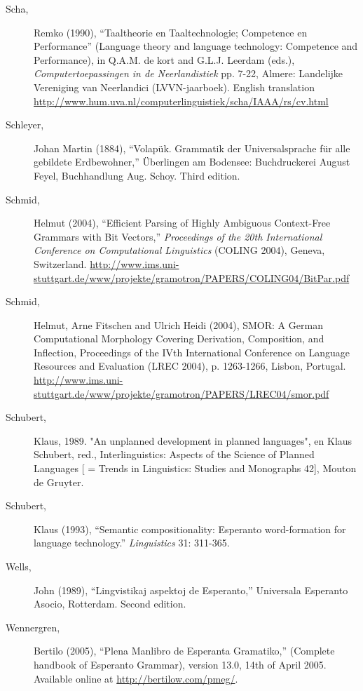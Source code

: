 \documentclass[10pt,a4paper]{article}
\begin{document}
\begin{description}
\item[Scha,] Remko (1990), ``Taaltheorie en Taaltechnologie; Competence en
Performance'' (Language theory and language technology: Competence and
Performance), in Q.A.M. de kort and G.L.J. Leerdam (eds.), {\em Computertoepassingen in de Neerlandistiek} pp. 7-22, Almere: Landelijke
Vereniging van Neerlandici (LVVN-jaarboek). English translation
\url{http://www.hum.uva.nl/computerlinguistiek/scha/IAAA/rs/cv.html}

\item[Schleyer,] Johan Martin (1884), ``Volap\"uk. Grammatik der Universalsprache f\"ur
alle gebildete Erdbewohner,'' \"Uberlingen am Bodensee: Buchdruckerei August
Feyel, Buchhandlung Aug. Schoy. Third edition.

\item[Schmid,] Helmut (2004), ``Efficient Parsing of Highly Ambiguous Context-Free
Grammars with Bit Vectors,'' {\em Proceedings of the 20th International Conference
on Computational Linguistics} (COLING 2004), Geneva, Switzerland.
\url{http://www.ims.uni-stuttgart.de/www/projekte/gramotron/PAPERS/COLING04/BitPar.pdf}

\item[Schmid,] Helmut, Arne Fitschen and Ulrich Heidi (2004), SMOR: A German Computational Morphology Covering Derivation, Composition, and Inflection, Proceedings of the IVth International Conference on Language Resources and Evaluation (LREC 2004), p. 1263-1266, Lisbon, Portugal. \url{http://www.ims.uni-stuttgart.de/www/projekte/gramotron/PAPERS/LREC04/smor.pdf}

\item[Schubert,] Klaus, 1989. "An unplanned development in planned languages", en Klaus Schubert, red., Interlinguistics: Aspects of the Science of Planned Languages [ = Trends in Linguistics: Studies and Monographs 42], Mouton de Gruyter.

\item[Schubert,] Klaus (1993), ``Semantic compositionality: Esperanto word-formation
for language technology.'' {\em Linguistics} 31: 311-365.

\item[Wells,] John (1989), ``Lingvistikaj aspektoj de Esperanto,'' Universala
Esperanto Asocio, Rotterdam. Second edition.

\item[Wennergren,] Bertilo (2005), ``Plena Manlibro de Esperanta Gramatiko,''
(Complete handbook of Esperanto Grammar), version 13.0, 14th of April 2005.
Available online at \url{http://bertilow.com/pmeg/}.


\end{description}
\end{document}
